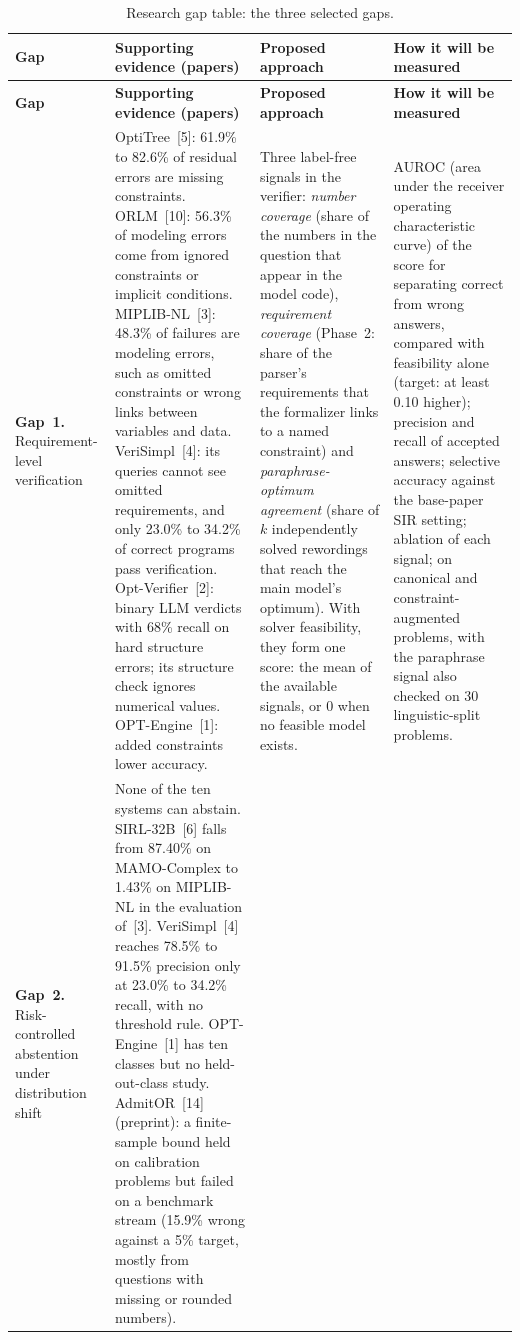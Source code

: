 \documentclass[11pt,a4paper]{article}
\renewcommand{\arraystretch}{1.18}
\begin{document}
{\footnotesize
\setlength{\tabcolsep}{4pt}
\renewcommand{\arraystretch}{1.22}
\begin{xltabular}{\textwidth}{@{}P{2.0cm}>{\raggedright\arraybackslash{}\hsize}X>{\raggedright\arraybackslash{}\hsize}X>{\raggedright\arraybackslash{}\hsize}X@{}}
\caption{Research gap table: the three selected gaps.}\label{tab:gaps}\\
\toprule
\textbf{Gap} & \textbf{Supporting evidence (papers)} & \textbf{Proposed approach} & \textbf{How it will be measured}\\
\midrule
\endfirsthead
\toprule
\textbf{Gap} & \textbf{Supporting evidence (papers)} & \textbf{Proposed approach} & \textbf{How it will be measured}\\
\midrule
\endhead
\bottomrule
\endlastfoot
\textcolor{gapone}{\textbf{Gap~1.}} Requirement-level verification &
OptiTree~[5]: 61.9\% to 82.6\% of residual errors are missing constraints. ORLM~[10]: 56.3\% of modeling errors come from ignored constraints or implicit conditions. MIPLIB-NL~[3]: 48.3\% of failures are modeling errors, such as omitted constraints or wrong links between variables and data. VeriSimpl~[4]: its queries cannot see omitted requirements, and only 23.0\% to 34.2\% of correct programs pass verification. Opt-Verifier~[2]: binary LLM verdicts with 68\% recall on hard structure errors; its structure check ignores numerical values. OPT-Engine~[1]: added constraints lower accuracy. &
Three label-free signals in the verifier: \textit{number coverage} (share of the numbers in the question that appear in the model code), \textit{requirement coverage} (Phase~2: share of the parser's requirements that the formalizer links to a named constraint) and \textit{paraphrase-optimum agreement} (share of $k$ independently solved rewordings that reach the main model's optimum). With solver feasibility, they form one score: the mean of the available signals, or 0 when no feasible model exists. &
AUROC (area under the receiver operating characteristic curve) of the score for separating correct from wrong answers, compared with feasibility alone (target: at least 0.10 higher); precision and recall of accepted answers; selective accuracy against the base-paper SIR setting; ablation of each signal; on canonical and constraint-augmented problems, with the paraphrase signal also checked on 30 linguistic-split problems.\\
\midrule
\textcolor{gaptwo}{\textbf{Gap~2.}} Risk-controlled abstention under distribution shift &
None of the ten systems can abstain. SIRL-32B~[6] falls from 87.40\% on MAMO-Complex to 1.43\% on MIPLIB-NL in the evaluation of~[3]. VeriSimpl~[4] reaches 78.5\% to 91.5\% precision only at 23.0\% to 34.2\% recall, with no threshold rule. OPT-Engine~[1] has ten classes but no held-out-class study. AdmitOR~[14] (preprint): a finite-sample bound held on calibration problems but failed on a benchmark stream (15.9\% wrong against a 5\% target, mostly from questions with missing or rounded numbers). &

\end{xltabular}}
\end{document}
